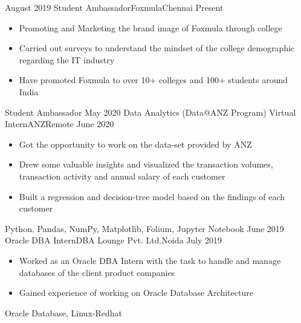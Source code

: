 %
%
%
\begin{experiences}
  \experience
    {August 2019}   {Student Ambassador}{Foxmula}{Chennai}
    {Present} {
                      \begin{itemize}
                        \item Promoting and Marketing the brand image of Foxmula through college                       
                        \item Carried out surveys to understand the mindset of the college demographic regarding the IT industry                   
                        \item Have promoted Foxmula to over 10+ colleges and 100+ students around India                
                                                                                       
                      \end{itemize}
                    }
                    {Student Ambassador}
  \emptySeparator
  \experience
    {May 2020} {Data Analytics (Data@ANZ Program) Virtual Intern}{ANZ}{Remote}
    {June 2020}    {
                      \begin{itemize}
                        \item Got the opportunity to work on the data-set provided by ANZ                           
                        \item Drew some valuable insights and visualized the transaction volumes, transaction activity and annual salary of each customer                       
                        \item Built a regression and decision-tree model based on the findings of each customer          
                                                
                      \end{itemize}
                    }
                    {Python, Pandas, NumPy, Matplotlib, Folium, Jupyter Notebook}
  \emptySeparator
  \experience
    {June 2019}     {Oracle DBA Intern}{DBA Lounge Pvt. Ltd.}{Noida}
    {July 2019}    {
                      \begin{itemize}
                        \item Worked as an Oracle DBA Intern with the task to handle and manage databases of the client product companies
               
                        \item Gained experience of working on Oracle Database Architecture          
                      \end{itemize}
                    }
                    {Oracle Database, Linux-Redhat}

\end{experiences}
